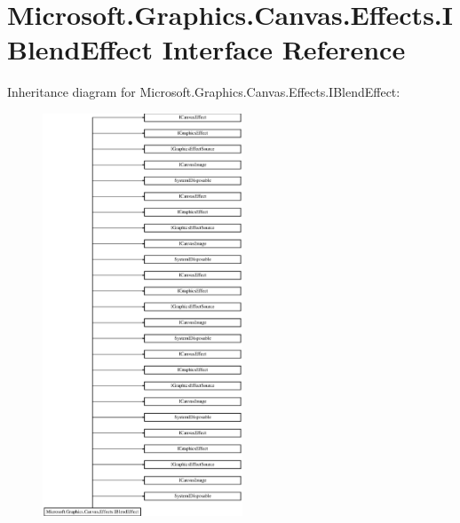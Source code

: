 \hypertarget{interface_microsoft_1_1_graphics_1_1_canvas_1_1_effects_1_1_i_blend_effect}{}\section{Microsoft.\+Graphics.\+Canvas.\+Effects.\+I\+Blend\+Effect Interface Reference}
\label{interface_microsoft_1_1_graphics_1_1_canvas_1_1_effects_1_1_i_blend_effect}
Inheritance diagram for Microsoft.\+Graphics.\+Canvas.\+Effects.\+I\+Blend\+Effect\+:\begin{figure}[H]
\begin{center}
\leavevmode
\includegraphics[height=12.000000cm]{interface_microsoft_1_1_graphics_1_1_canvas_1_1_effects_1_1_i_blend_effect}
\end{center}
\end{figure}
